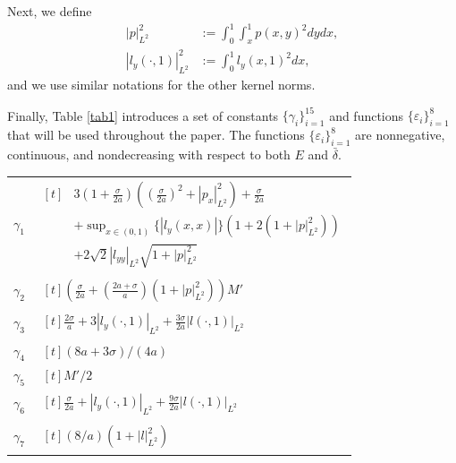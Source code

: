\documentclass[twocolumn]{autart}
\begin{document}
Next, we define 
\begin{align*}
|p|_{L^2}^2 &:= \int_{0}^{1}\int_{x}^{1}p(x,y)^2dydx, \\
|l_y(\cdot,1)|_{L^2}^2 &:= \int_{0}^{1}l_y(x,1)^2dx,
\end{align*}
and we use similar notations for the other kernel norms.

Finally, Table \ref{tab1} introduces a set of constants $\{\gamma_i\}_{i=1}^{15}$ and functions $\{\varepsilon_i\}_{i=1}^{8}$ that will be used throughout the paper. The functions $\{\varepsilon_i\}_{i=1}^{8}$ are nonnegative, continuous, and nondecreasing with respect to both $E$ and $\bar{\delta}$.

\begin{table}
\centering
\renewcommand{\arraystretch}{2}
\begin{tabular}{@{}ll@{}}
\toprule
$\gamma_1$ & $\begin{aligned}[t]
&3\left(1+\frac{\sigma}{2a}\right)\left(\left(\frac{\sigma}{2a}\right)^2+|p_x|_{L^2}^2\right)+\frac{\sigma}{2a}\\
&+\sup_{x\in (0,1)}\{|l_y(x,x)|\}\left(1+2\left(1+|p|_{L^2}^2\right)\right)\\
&+2\sqrt{2}|l_{yy}|_{L^2}\sqrt{1+|p|_{L^2}^2}
\end{aligned}$ \\
$\gamma_2$ & $\begin{aligned}[t]\left(\frac{\sigma}{2a}+\left(\frac{2a+\sigma}{a}\right)\left(1+|p|_{L^2}^2\right)\right)M'\end{aligned}$ \\
$\gamma_3$ & $\begin{aligned}[t]\frac{2\sigma}{a}+3|l_y(\cdot,1)|_{L^2}+\frac{3\sigma}{2a}|l(\cdot,1)|_{L^2}\end{aligned}$ \\
$\gamma_4$ & $\begin{aligned}[t](8a+3\sigma)/(4a)\end{aligned}$ \\
$\gamma_5$ & $\begin{aligned}[t]M'/2\end{aligned}$ \\
$\gamma_6$ & $\begin{aligned}[t]\frac{\sigma}{2a}+|l_y(\cdot,1)|_{L^2}+\frac{9\sigma}{2a}|l(\cdot,1)|_{L^2}\end{aligned}$ \\
$\gamma_7$ & $\begin{aligned}[t](8/a)\left(1+|l|_{L^2}^2\right)\end{aligned}$ \\

\end{tabular}
\end{table}
\end{document}
